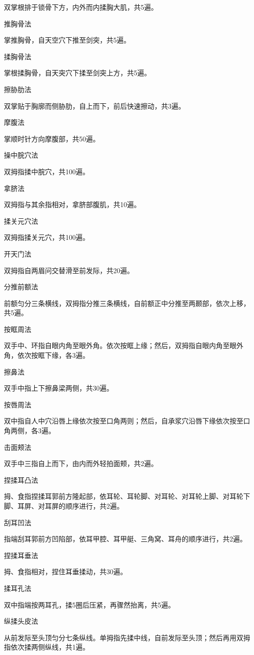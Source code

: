 \documentclass[12pt,UTF8]{ctexbook}
\begin{document}
双掌根排于锁骨下方，内外而内揉胸大肌，共5遍。

推胸骨法

掌推胸骨，自天空穴下推至剑突，共5遍。

揉胸骨法

掌根揉胸骨，自天突穴下揉至剑突上方，共5遍。

擦胁肋法

双掌贴于胸廓而侧胁肋，自上而下，前后快速擦动，共3遍。

摩腹法

掌顺时针方向摩腹部，共50遍。

操中脘穴法

双拇指揉中脘穴，共100遍。

拿脐法

双拇指与其余指相对，拿脐部腹肌，共10遍。

揉关元穴法

双拇指揉关元穴，共100遍。

开天门法

双拇指自两眉问交替滑至前发际，共20遍。

分推前额法

前额匀分三条横线，双拇指分推三条横线，自前额正中分推至两颞部，依次上移，共5遍。

按眶周法

双手中、环指自眼内角至眼外角。依次按眶上缘；然后，双拇指自眼内角至眼外角，依次按眶下缘，各3遍。

擦鼻法

双手中指上下擦鼻梁两侧，共30遍。

按唇周法

双中指自人中穴沿唇上缘依次按至口角两则；然后，自承浆穴沿唇下缘依次按至口角两侧，各3遍。

击面颊法

双手中三指自上而下，由内而外轻拍面颊，共2遍。

捏揉耳凸法

拇、食指捏揉耳郭前方隆起部，依耳轮、耳轮脚、对耳轮、对耳轮上脚、对耳轮下脚、耳屏、对耳屏的顺序进行，共2遍。

刮耳凹法

指端刮耳郭前方凹陷部，依耳甲腔、耳甲艇、三角窝、耳舟的顺序进行，共2遍。

捏揉耳垂法

拇、食指相对，捏住耳垂揉动，共30遍。

揉耳孔法

双中指端按两耳孔，揉5圈后压紧，再骤然抬离，共5遍。

纵揉头皮法

从前发际至头顶匀分七条纵线。单拇指先揉中线，自前发际至头顶；然后再用双拇指依次揉两侧纵线，共1遍。
\end{document}
